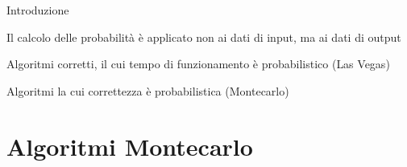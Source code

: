 \begin{frame}{Introduzione}

Il calcolo delle probabilità è applicato non ai dati di input, ma ai dati di output
\BIL
\item  Algoritmi corretti, il cui tempo di funzionamento è probabilistico (\alert{Las Vegas})
\item Algoritmi la cui correttezza è probabilistica (\alert{Montecarlo})
\EIL

\end{frame}

\section{Algoritmi Montecarlo}

